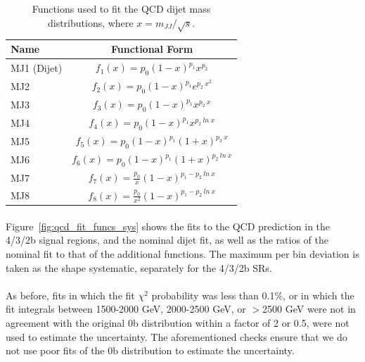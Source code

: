 \begin{table}[htbp!]
\begin{center} 
\begin{tabular}{  l | c}
Name & Functional Form \\
\hline
MJ1 (Dijet) & $f_{1}(x) = p_0 (1-x)^{p_1} x^{p_2}$ \\
MJ2 & $f_{2}(x) = p_0 (1-x)^{p_1} e^{p_2\ x^2}$ \\
MJ3 & $f_{3}(x) = p_0 (1-x)^{p_1} x^{p_2\ x}$ \\
MJ4 & $f_{4}(x) = p_0 (1-x)^{p_1} x^{p_2\ ln\ x}$ \\
MJ5 & $f_{5}(x) = p_0 (1-x)^{p_1} (1+x)^{p_2\ x}$ \\
MJ6 & $f_{6}(x) = p_0 (1-x)^{p_1} (1+x)^{p_2\ ln\ x}$ \\
MJ7 & $f_{7}(x) = \frac{p_0}{x} (1-x)^{p_1 - p_2\ ln\ x}$ \\
MJ8 & $f_{8}(x) = \frac{p_0}{x^2} (1-x)^{p_1 - p_2\ ln\ x}$ \\
\hline
\end{tabular}
\caption{Functions used to fit the QCD dijet mass distributions, where $x = m_{JJ} / \sqrt{s}$.}
\label{tab:fit_funcs}
\end{center}
\end{table}

\paragraph{}
Figure~\ref{fig:qcd_fit_funcs_sys} shows the fits to the QCD prediction in the 4/3/2b  signal regions, and the nominal dijet fit, as well as the ratios of the nominal fit to that of the additional functions.  The maximum per bin deviation is taken as the shape systematic, separately for the 4/3/2b SRs.

\paragraph{}
As before, fits in which the fit $\chi^2$ probability was less than 0.1\%,  or in which the fit integrals between 1500-2000 GeV, 2000-2500 GeV, or $>$2500 GeV were not in agreement with the original 0b distribution within a factor of 2 or 0.5, were not used to estimate the uncertainty.  The aforementioned checks ensure that we do not use poor fits of the 0b distribution to estimate the uncertainty.

